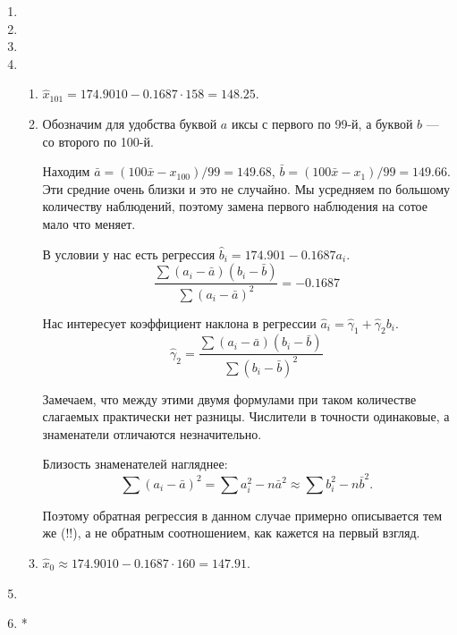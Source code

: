 \documentclass[12pt]{article}
\begin{document}
\begin{enumerate}
\item 
\item 
\item 

\item 
\begin{enumerate}
    \item $\hat x_{101} = 174.9010 - 0.1687 \cdot 158 = 148.25$.
    \item Обозначим для удобства буквой $a$ иксы с первого по 99-й,
    а буквой $b$ — со второго по 100-й. 

    Находим $\bar a = (100\bar x - x_{100})/99 = 149.68$, $\bar b = (100\bar x - x_{1})/99=149.66$.
    Эти средние очень близки и это не случайно. 
    Мы усредняем по большому количеству наблюдений, поэтому замена первого наблюдения 
    на сотое мало что меняет.
    
    В условии у нас есть регрессия $\hat b_i = 174.901 - 0.1687 a_i$.
    \[
    \frac{\sum (a_i - \bar a)(b_i - \bar b)}{\sum (a_i - \bar a)^2} = -0.1687    
    \]

    Нас интересует коэффициент наклона в регрессии $\hat a_i = \hat\gamma_1 +\hat\gamma_2 b_i$.
    \[
    \hat\gamma_2 = \frac{\sum (a_i - \bar a)(b_i - \bar b)}{\sum (b_i - \bar b)^2}     
    \]

    Замечаем, что между этими двумя формулами при таком количестве слагаемых практически нет разницы.
    Числители в точности одинаковые, а знаменатели отличаются незначительно. 

    Близость знаменателей нагляднее:
    \[
    \sum (a_i - \bar a)^2 = \sum a_i^2 - n \bar a^2 \approx \sum b_i^2 - n \bar b^2.
    \]

    
    Поэтому обратная регрессия в данном случае примерно описывается тем же (!!), а не обратным соотношением, 
    как кажется на первый взгляд.

    \item $\hat x_{0} \approx 174.9010 - 0.1687 \cdot 160 = 147.91$.


\end{enumerate}

\item 
\item *

\end{enumerate}
\end{document}
